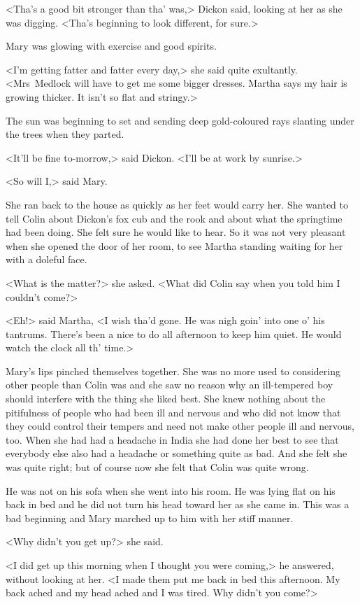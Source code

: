 <Tha's a good bit stronger than tha' was,> Dickon said, looking at her as she was digging. <Tha's beginning to look different, for sure.>

Mary was glowing with exercise and good spirits.

<I'm getting fatter and fatter every day,> she said quite exultantly. <Mrs~Medlock will have to get me some bigger dresses. Martha says my hair is growing thicker. It isn't so flat and stringy.>

The sun was beginning to set and sending deep gold-coloured rays slanting under the trees when they parted.

<It'll be fine to-morrow,> said Dickon. <I'll be at work by sunrise.>

<So will I,> said Mary.

She ran back to the house as quickly as her feet would carry her. She wanted to tell Colin about Dickon's fox cub and the rook and about what the springtime had been doing. She felt sure he would like to hear. So it was not very pleasant when she opened the door of her room, to see Martha standing waiting for her with a doleful face.

<What is the matter?> she asked. <What did Colin say when you told him I couldn't come?>

<Eh!> said Martha, <I wish tha'd gone. He was nigh goin' into one o' his tantrums. There's been a nice to do all afternoon to keep him quiet. He would watch the clock all th' time.>

Mary's lips pinched themselves together. She was no more used to considering other people than Colin was and she saw no reason why an ill-tempered boy should interfere with the thing she liked best. She knew nothing about the pitifulness of people who had been ill and nervous and who did not know that they could control their tempers and need not make other people ill and nervous, too. When she had had a headache in India she had done her best to see that everybody else also had a headache or something quite as bad. And she felt she was quite right; but of course now she felt that Colin was quite wrong.

He was not on his sofa when she went into his room. He was lying flat on his back in bed and he did not turn his head toward her as she came in. This was a bad beginning and Mary marched up to him with her stiff manner.

<Why didn't you get up?> she said.

<I did get up this morning when I thought you were coming,> he answered, without looking at her. <I made them put me back in bed this afternoon. My back ached and my head ached and I was tired. Why didn't you come?>

